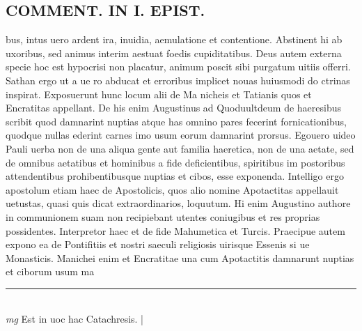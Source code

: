 \documentclass{article}
\begin{document}
\begin{pages}
\section*{COMMENT. IN I. EPIST. }\pstart bus, intus uero ardent ira, inuidia, aemulatione et contentione. Abstinent hi ab uxoribus, sed animus interim aestuat foedis cupiditatibus. Deus autem externa specie hoc est hypocrisi non placatur, animum poscit sibi purgatum uitiis offerri. Sathan ergo ut a ue ro abducat et erroribus implicet nouas huiusmodi do ctrinas inspirat. Exposuerunt hunc locum alii de Ma nicheis et Tatianis quos et Encratitas appellant. De his enim Augustinus ad Quoduultdeum de haeresibus scribit quod damnarint nuptias atque has omnino pares fecerint fornicationibus, quodque nullas ederint carnes imo usum eorum damnarint prorsus. Egouero uideo Pauli uerba non de una aliqua gente aut familia haeretica, non de una aetate, sed de omnibus aetatibus et hominibus a fide deficientibus, spiritibus im postoribus attendentibus prohibentibusque nuptias et cibos, esse exponenda. Intelligo ergo apostolum etiam haec de Apostolicis, quos alio nomine Apotactitas appellauit uetustas, quasi quis dicat extraordinarios, loquutum. Hi enim Augustino authore in communionem suam non recipiebant utentes coniugibus et res proprias possidentes. Interpretor haec et de fide Mahumetica et Turcis. Praecipue autem expono ea de Pontifitiis et nostri saeculi religiosis uirisque Essenis si ue Monasticis. Manichei enim et Encratitae una cum Apotactitis damnarunt nuptias et ciborum usum ma  \pend
\vspace{0.5cm}\noindent
\vspace{0.2cm}\rule{1cm}{0.2pt}\\ 
\hspace{0.2cm}\textit{mg}
\footnotesize Est in uoc hac Catachresis. 
\normalsize| 

\end{pages}
\end{document}
